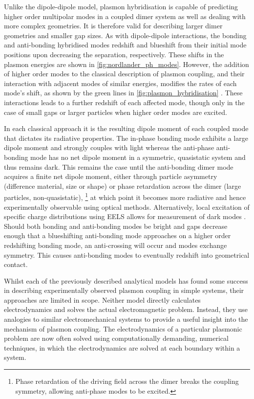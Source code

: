 \documentclass{article}
\begin{document}
Unlike the dipole-dipole model, plasmon hybridisation is capable of predicting higher order multipolar modes in a coupled dimer system as well as dealing with more complex geometries. It is therefore valid for describing larger dimer geometries and smaller gap sizes. As with dipole-dipole interactions, the bonding and anti-bonding hybridised modes redshift and blueshift from their initial mode positions upon decreasing the separation, respectively. These shifts in the plasmon energies are shown in \autoref{fig:nordlander_ph_modes}. However, the addition of higher order modes to the classical description of plasmon coupling, and their interaction with adjacent modes of similar energies, modifies the rates of each mode's shift, as shown by the green lines in \autoref{fig:plasmon_hybridisation} \cite{nordlander2004}. These interactions leads to a further redshift of each affected mode, though only in the case of small gaps or larger particles when higher order modes are excited.

In each classical approach it is the resulting dipole moment of each coupled mode that dictates its radiative properties. The in-phase bonding mode exhibits a large dipole moment and strongly couples with light whereas the anti-phase anti-bonding mode has no net dipole moment in a symmetric, quasistatic system and thus remains dark. This remains the case until the anti-bonding dimer mode acquires a finite net dipole moment, either through particle asymmetry (difference material, size or shape) or phase retardation across the dimer (large particles, non-quasistatic),%
\footnote{Phase retardation of the driving field across the dimer breaks the coupling symmetry, allowing anti-phase modes to be excited.}
at which point it becomes more radiative and hence experimentally observable using optical methods. Alternatively, local excitation of specific charge distributions using EELS allows for measurement of dark modes \cite{chu2008, koh2009}. Should both bonding and anti-bonding modes be bright and gaps decrease enough that a blueshifting anti-bonding mode approaches on a higher order redshifting bonding mode, an anti-crossing will occur and modes exchange symmetry. This causes anti-bonding modes to eventually redshift into geometrical contact.

Whilst each of the previously described analytical models has found some success in describing experimentally observed plasmon coupling in simple systems, their approaches are limited in scope. Neither model directly calculates electrodynamics and solves the actual electromagnetic problem. Instead, they use analogies to similar electromechanical systems to provide a useful insight into the mechanism of plasmon coupling. The electrodynamics of a particular plasmonic problem are now often solved using computationally demanding, numerical techniques, in which the electrodynamics are solved at each boundary within a system.
\end{document}

